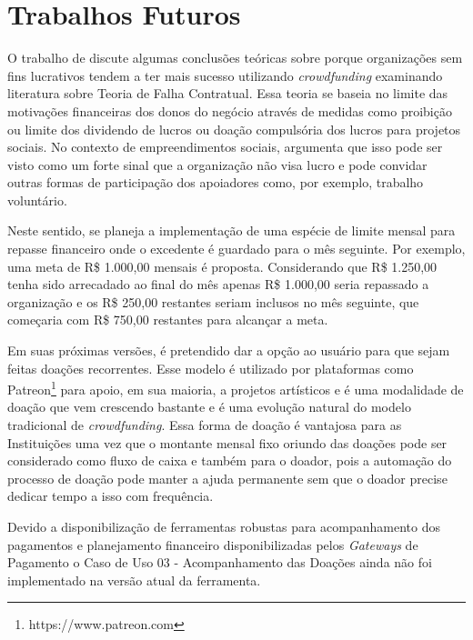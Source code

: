 
\section{Trabalhos Futuros}

O trabalho de \citeauthor{belleflamme2010} discute algumas conclusões teóricas sobre porque organizações sem fins lucrativos tendem a ter mais sucesso utilizando \emph{crowdfunding} examinando literatura sobre Teoria de Falha Contratual. Essa teoria se baseia no limite das motivações financeiras dos donos do negócio através de medidas como proibição ou limite dos dividendo de lucros ou doação compulsória dos lucros para projetos sociais. No contexto de empreendimentos sociais, \citeauthor{lehner2013crowdfunding} argumenta que isso pode ser visto como um forte sinal que a organização não visa lucro e pode convidar outras formas de participação dos apoiadores como, por exemplo, trabalho voluntário.

Neste sentido, se planeja a implementação de uma espécie de limite mensal para repasse financeiro onde o excedente é guardado para o mês seguinte. Por exemplo, uma meta de R\$ 1.000,00 mensais é proposta. Considerando que R\$ 1.250,00 tenha sido arrecadado ao final do mês apenas R\$ 1.000,00 seria repassado a organização e os R\$ 250,00 restantes seriam inclusos no mês seguinte, que começaria com R\$ 750,00 restantes para alcançar a meta.

Em suas próximas versões, é pretendido dar a opção ao usuário para que sejam feitas doações recorrentes. Esse modelo é utilizado por plataformas como Patreon\footnote{https://www.patreon.com} para apoio, em sua maioria, a projetos artísticos e é uma modalidade de doação que vem crescendo bastante e é uma evolução natural do modelo tradicional de \emph{crowdfunding}. Essa forma de doação é vantajosa para as Instituições uma vez que o montante mensal fixo oriundo das doações pode ser considerado como fluxo de caixa e também para o doador, pois a automação do processo de doação pode manter a ajuda permanente sem que o doador precise dedicar tempo a isso com frequência.

Devido a disponibilização de ferramentas robustas para acompanhamento dos pagamentos e planejamento financeiro disponibilizadas pelos \emph{Gateways} de Pagamento o Caso de Uso 03 - Acompanhamento das Doações ainda não foi implementado na versão atual da ferramenta.